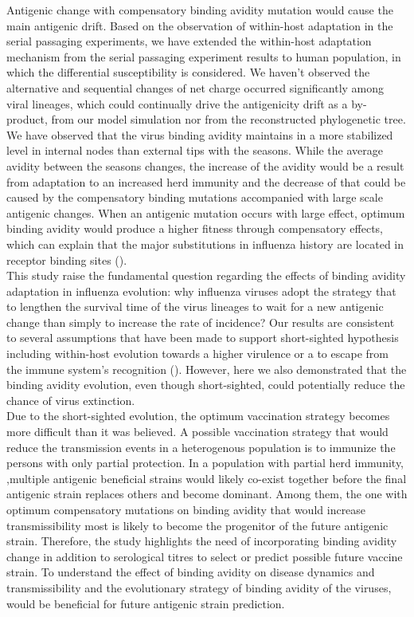 \documentclass[12pt,a4paper]{article}
\begin{document}
Antigenic change with compensatory binding avidity mutation would cause the main antigenic drift. Based on the observation of within-host adaptation in the serial passaging experiments,  we have extended the within-host adaptation mechanism from the serial passaging experiment results to human population, in which the differential susceptibility is considered. We haven’t observed the alternative and sequential changes of net charge occurred significantly among viral lineages, which could continually drive the antigenicity drift as a by-product, from our model simulation nor from the reconstructed phylogenetic tree. We have observed that the virus binding avidity maintains in a more stabilized level in internal nodes than external tips with the seasons. While the average avidity between the seasons changes, the increase of the avidity would be a result from adaptation to an increased herd immunity and the decrease of that could be caused by the compensatory binding mutations accompanied with large scale antigenic changes. When an antigenic mutation occurs with large effect, optimum binding avidity would produce a higher fitness through compensatory effects, which can explain that the major substitutions in influenza history are located in receptor binding sites (\cite{Burke2013}).  \\
This study raise the fundamental question regarding the effects of binding avidity adaptation in influenza evolution: why influenza viruses adopt the strategy that to lengthen the survival time of the virus lineages to wait for a new antigenic change than simply to increase the rate of incidence? Our results are consistent to several assumptions that have been made to support short-sighted hypothesis including within-host evolution towards a higher virulence or a to escape from the immune system’s recognition (\cite{Levin1994}). However, here we also demonstrated that the binding avidity evolution, even though short-sighted, could potentially reduce the chance of virus extinction. \\
Due to the short-sighted evolution, the optimum vaccination strategy becomes more difficult than it was believed. A possible vaccination strategy that would reduce the transmission events  in a heterogenous population is to immunize the persons with only partial protection. In a population with partial herd immunity, ,multiple antigenic beneficial strains would likely co-exist together before the final antigenic strain replaces others and become dominant. Among them, the one with optimum compensatory mutations on binding avidity that would increase transmissibility most is likely to become the progenitor of the future antigenic strain. Therefore, the study highlights the need of incorporating binding avidity change in addition to serological titres to select or predict possible future vaccine strain. To understand the effect of binding avidity on disease dynamics and transmissibility and the evolutionary strategy of binding avidity of the viruses, would be beneficial for future antigenic strain prediction. \\
\end{document}
